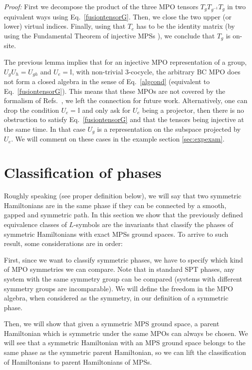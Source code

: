 \documentclass[a4paper,twocolumn,11pt,accepted=2023-02-10]{quantumarticle}
\newcommand{\id}{\mathbb{I}}
\begin{document}
{\it Proof:} First we decompose the product of the three MPO tensors $T_g T_{g^{-1}} T_g$ in two equivalent ways using Eq.\ \eqref{fusiontensorG}. Then, we close the two upper (or lower) virtual indices. Finally, using that $T_e$ has to be the identity matrix (by using the Fundamental Theorem of injective MPSs \cite{Molnar18A}), we conclude that $T_g$ is on-site.  


The previous lemma implies that for an injective MPO representation of a group, $U_g U_h = U_{gh}$ and $U_e=\id$, with non-trivial $3$-cocycle, the arbitrary BC MPO does not form a closed algebra in the sense of Eq.\ \eqref{algcond} (equivalent to Eq.\ \eqref{fusiontensorG}). This means that these MPOs are not covered by the formalism of Refs.\ \cite{Lootens21A, molnar22}, we left the connection for future work. Alternatively, one can drop the condition $U_e=\id$ and only ask for $U_e$ being a projector, then there is no obstruction to satisfy Eq.\ \eqref{fusiontensorG} and that the tensors being injective at the same time. In that case $U_g$ is a representation on the subspace projected by $U_e$. We will comment on these cases in the example section \ref{sec:expexam}.


\section{Classification of phases}\label{sec:classif}

Roughly speaking (see proper definition below), we will say that two symmetric Hamiltonians are in the same phase if they can be connected by a smooth, gapped and symmetric path. In this section we show that the previously defined equivalence classes of ${L}$-symbols are the invariants that classify the phases of symmetric Hamiltonians with exact MPSs ground spaces. To arrive to such result, some considerations are in order:

First, since we want to classify symmetric phases, we have to specify which kind of MPO symmetries we can compare. Note that in standard SPT phases, any system with the same symmetry group can be compared (systems with different symmetry groups are incomparable). We will define the freedom in the MPO algebra, when considered as the symmetry, in our definition of a symmetric phase. 


Then, we will show that given a symmetric MPS ground space, a parent Hamiltonian which is symmetric under the same MPOs can always be chosen. We will see that a symmetric Hamiltonian with an MPS ground space belongs to the same phase as the symmetric parent Hamiltonian, so we can lift the classification of Hamiltonians to parent Hamiltonians of MPSs. 
\end{document}
